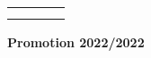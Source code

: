 \begin{titlepage}
\begin{center}
\begin{tabular}{llll}
			
			
			
			\\\\
			\\

			
		\end{tabular}
	\end{center}
	\vspace{-0.5mm}
	\begin{center}
	 \textbf{Promotion 2022/2022}
	\end{center}

\end{titlepage}
